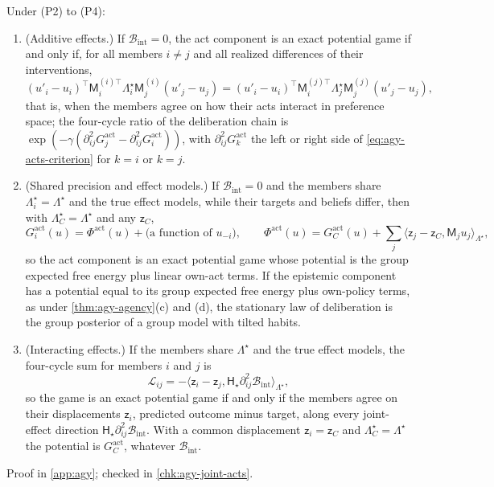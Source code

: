 \begin{theorem}\label{thm:agy-joint-acts}
Under (P2) to (P4):
\begin{enumerate}
\item[(a)] (Additive effects.) If $\mathcal B_{\mathrm{int}}=0$, the act component is an exact potential game if and only if, for all members $i\ne j$ and all realized differences of their interventions,
\begin{equation}\label{eq:agy-acts-criterion}
(u'_i-u_i)^\top\mathsf M^{(i)\top}_i\Lambda^\star_i\mathsf M^{(i)}_j(u'_j-u_j)=(u'_i-u_i)^\top\mathsf M^{(j)\top}_i\Lambda^\star_j\mathsf M^{(j)}_j(u'_j-u_j),
\end{equation}
that is, when the members agree on how their acts interact in preference space; the four-cycle ratio of the deliberation chain is $\exp(-\gamma(\partial^2_{ij}G^{\mathrm{act}}_j-\partial^2_{ij}G^{\mathrm{act}}_i))$, with $\partial^2_{ij}G^{\mathrm{act}}_k$ the left or right side of \eqref{eq:agy-acts-criterion} for $k=i$ or $k=j$.
\item[(b)] (Shared precision and effect models.) If $\mathcal B_{\mathrm{int}}=0$ and the members share $\Lambda^\star_i=\Lambda^\star$ and the true effect models, while their targets and beliefs differ, then with $\Lambda^\star_C=\Lambda^\star$ and any $\mathsf z_C$,
\begin{equation}\label{eq:agy-act-potential}
G^{\mathrm{act}}_i(u)=\Phi^{\mathrm{act}}(u)+\bigl(\text{a function of }u_{-i}\bigr),\qquad\Phi^{\mathrm{act}}(u)=G^{\mathrm{act}}_C(u)+\sum_j\langle\mathsf z_j-\mathsf z_C,\mathsf M_ju_j\rangle_{\Lambda^\star},
\end{equation}
so the act component is an exact potential game whose potential is the group expected free energy plus linear own-act terms. If the epistemic component has a potential equal to its group expected free energy plus own-policy terms, as under \cref{thm:agy-agency}(c) and (d), the stationary law of deliberation is the group posterior of a group model with tilted habits.
\item[(c)] (Interacting effects.) If the members share $\Lambda^\star$ and the true effect models, the four-cycle sum for members $i$ and $j$ is
\begin{equation}\label{eq:agy-acts-cycle}
\mathcal L_{ij}=-\bigl\langle\mathsf z_i-\mathsf z_j,\mathsf H_\star\partial^2_{ij}\mathcal B_{\mathrm{int}}\bigr\rangle_{\Lambda^\star},
\end{equation}
so the game is an exact potential game if and only if the members agree on their displacements $\mathsf z_i$, predicted outcome minus target, along every joint-effect direction $\mathsf H_\star\partial^2_{ij}\mathcal B_{\mathrm{int}}$. With a common displacement $\mathsf z_i=\mathsf z_C$ and $\Lambda^\star_C=\Lambda^\star$ the potential is $G^{\mathrm{act}}_C$, whatever $\mathcal B_{\mathrm{int}}$.
\end{enumerate}
Proof in \cref{app:agy}; checked in \cref{chk:agy-joint-acts}.
\end{theorem}

